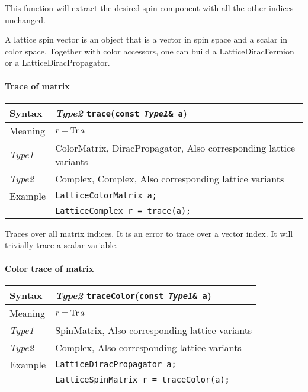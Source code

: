 \documentclass[12pt,letterpaper]{article}
\newcommand{\Tr}{\mathop{\rm Tr}}
\newcommand{\tLatticeComplex}{LatticeComplex}
\newcommand{\tLatticeColorMatrix}{LatticeColorMatrix}
\newcommand{\tLatticeSpinMatrix}{LatticeSpinMatrix}
\newcommand{\tLatticeDiracFermion}{LatticeDiracFermion}
\newcommand{\tLatticeDiracPropagator}{LatticeDiracPropagator}
\newcommand{\tComplex}{Complex}
\newcommand{\tColorMatrix}{ColorMatrix}
\newcommand{\tDiracPropagator}{DiracPropagator}
\newcommand{\tSpinMatrix}{SpinMatrix}
\newcommand{\simLatticeVariants}{Also corresponding lattice variants}
\begin{document}
This function will extract the desired spin component with all the
other indices unchanged.

A lattice spin vector is an object that is a vector in spin space and
a scalar in color space.  Together with color accessors, one can build
a \tLatticeDiracFermion{} or a \tLatticeDiracPropagator.

\paragraph{Trace of matrix}

\begin{flushleft}
  \begin{tabular}{|l|l|}
  \hline
  Syntax      & {\it Type2} \verb|trace|({\tt const {\it Type1}\& a})\\
  \hline
  Meaning     & $r = \Tr a$ \\
  \hline
  {\it Type1} & \tColorMatrix, \tDiracPropagator, \simLatticeVariants\\
  {\it Type2} & \tComplex, \tComplex, \simLatticeVariants\\
  \hline
  Example     & {\tt \tLatticeColorMatrix{} a;}\\
              & {\tt \tLatticeComplex{} r = trace(a);} \\
  \hline
  \end{tabular}
\end{flushleft}

Traces over all matrix indices. It is an error to trace over a vector index.
It will trivially trace a scalar variable.

\paragraph{Color trace of matrix}

\begin{flushleft}
  \begin{tabular}{|l|l|}
  \hline
  Syntax      & {\it Type2} \verb|traceColor|({\tt const {\it Type1}\& a})\\
  \hline
  Meaning     & $r = \Tr a$ \\
  \hline
  {\it Type1} & \tSpinMatrix, \simLatticeVariants\\
  {\it Type2} & \tComplex, \simLatticeVariants\\
  \hline
  \hline
  Example     & {\tt \tLatticeDiracPropagator{} a;}\\
              & {\tt \tLatticeSpinMatrix{} r = traceColor(a);} \\
  \hline
  \end{tabular}
\end{flushleft}
\end{document}
